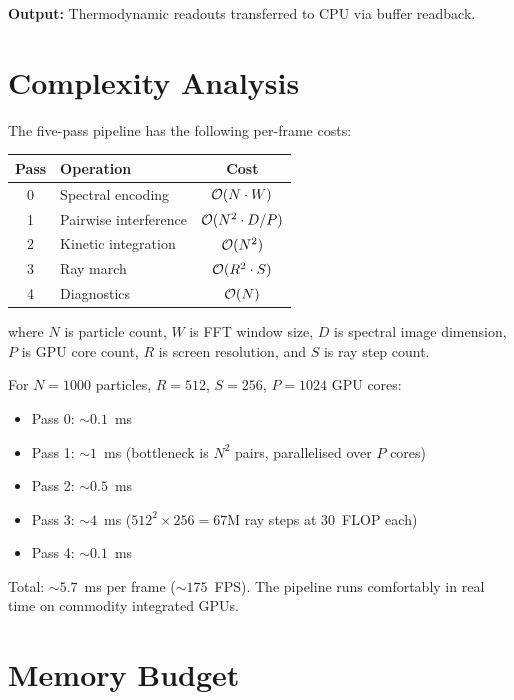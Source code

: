 \textbf{Output:} Thermodynamic readouts transferred to CPU via buffer readback.

\section{Complexity Analysis}
\label{sec:complexity}

\begin{theorem}
The five-pass pipeline has the following per-frame costs:
\begin{center}
\begin{tabular}{clc}
\toprule
Pass & Operation & Cost \\
\midrule
0 & Spectral encoding & $\mathcal{O}(N \cdot W)$ \\
1 & Pairwise interference & $\mathcal{O}(N^2 \cdot D/P)$ \\
2 & Kinetic integration & $\mathcal{O}(N^2)$ \\
3 & Ray march & $\mathcal{O}(R^2 \cdot S)$ \\
4 & Diagnostics & $\mathcal{O}(N)$ \\
\bottomrule
\end{tabular}
\end{center}
where $N$ is particle count, $W$ is FFT window size, $D$ is spectral image dimension, $P$ is GPU core count, $R$ is screen resolution, and $S$ is ray step count.
\end{theorem}

For $N = 1000$ particles, $R = 512$, $S = 256$, $P = 1024$ GPU cores:
\begin{itemize}
    \item Pass 0: $\sim 0.1$~ms
    \item Pass 1: $\sim 1$~ms (bottleneck is $N^2$ pairs, parallelised over $P$ cores)
    \item Pass 2: $\sim 0.5$~ms
    \item Pass 3: $\sim 4$~ms ($512^2 \times 256 = 67$M ray steps at 30~FLOP each)
    \item Pass 4: $\sim 0.1$~ms
\end{itemize}

Total: $\sim 5.7$~ms per frame ($\sim 175$~FPS). The pipeline runs comfortably in real time on commodity integrated GPUs.

\section{Memory Budget}
\label{sec:memory}

